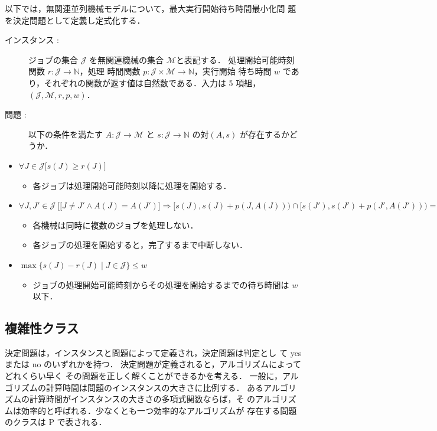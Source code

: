 \documentclass[12pt]{optlab-bachelor}
\begin{document}
以下では，無関連並列機械モデルについて，最大実行開始待ち時間最小化問
題を決定問題として定義し定式化する．

\begin{description}

  \item[インスタンス : ] ジョブの集合 $\mathcal{J}$ を無関連機械の集合 $\mathcal{M}$と表記する．
  処理開始可能時刻関数 $r : \mathcal{J} \to \mathbb{N}$，処理
  時間関数 $p : \mathcal{J} \times \mathcal{M} \to \mathbb{N}$，実行開始
  待ち時間 $w$ であり，それぞれの関数が返す値は自然数である．入力は 5 項組，$(\mathcal{J}, \mathcal{M}, r, p, w)$．

  \item[問題 : ] 以下の条件を満たす $A : \mathcal{J} \to \mathcal{M}$ と $s : \mathcal{J} \to \mathbb{N}$ の対$(A,s)$ が存在するかどうか．
\end{description}

\begin{itemize}
  \item $\forall J \in \mathcal{J}\big[s(J) \ge r(J) \big]$
  \begin{itemize}
    \item 各ジョブは処理開始可能時刻以降に処理を開始する．
  \end{itemize}
  \item {\footnotesize $\forall J, J' \in \mathcal{J}\ \Big[ \big[J\ne J' \land A(J) = A(J')\big] \Rightarrow [s(J), s(J)+p(J,A(J))) \cap[s(J'), s(J')+p(J', A(J'))) = \emptyset \Big]$}
  \begin{itemize}
    \item 各機械は同時に複数のジョブを処理しない．
    \item 各ジョブの処理を開始すると，完了するまで中断しない．
  \end{itemize}
  \item $\max\big\{s(J) - r(J) \mid J \in \mathcal{J}\big\} \le w$
  \begin{itemize}
    \item ジョブの処理開始可能時刻からその処理を開始するまでの待ち時間は $w$ 以下．
  \end{itemize}
\end{itemize}

\subsection{複雑性クラス}
決定問題は，インスタンスと問題によって定義され，決定問題は判定とし
て yes または no のいずれかを持つ．
決定問題が定義されると，アルゴリズムによってどれくらい早く
その問題を正しく解くことができるかを考える．
一般に，アルゴリズムの計算時間は問題のインスタンスの大きさに比例する．
あるアルゴリズムの計算時間がインスタンスの大きさの多項式関数ならば，そ
のアルゴリズムは効率的と呼ばれる．少なくとも一つ効率的なアルゴリズムが
存在する問題のクラスは P で表される．
\end{document}
